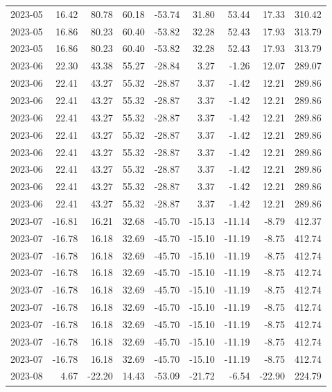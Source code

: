 \begin{table}[ht]
\begin{tabular}{lrrrrrrrr}
  2023-05 & 16.42 & 80.78 & 60.18 & -53.74 & 31.80 & 53.44 & 17.33 & 310.42 \\ 
  2023-05 & 16.86 & 80.23 & 60.40 & -53.82 & 32.28 & 52.43 & 17.93 & 313.79 \\ 
  2023-05 & 16.86 & 80.23 & 60.40 & -53.82 & 32.28 & 52.43 & 17.93 & 313.79 \\ 
  2023-06 & 22.30 & 43.38 & 55.27 & -28.84 & 3.27 & -1.26 & 12.07 & 289.07 \\ 
  2023-06 & 22.41 & 43.27 & 55.32 & -28.87 & 3.37 & -1.42 & 12.21 & 289.86 \\ 
  2023-06 & 22.41 & 43.27 & 55.32 & -28.87 & 3.37 & -1.42 & 12.21 & 289.86 \\ 
  2023-06 & 22.41 & 43.27 & 55.32 & -28.87 & 3.37 & -1.42 & 12.21 & 289.86 \\ 
  2023-06 & 22.41 & 43.27 & 55.32 & -28.87 & 3.37 & -1.42 & 12.21 & 289.86 \\ 
  2023-06 & 22.41 & 43.27 & 55.32 & -28.87 & 3.37 & -1.42 & 12.21 & 289.86 \\ 
  2023-06 & 22.41 & 43.27 & 55.32 & -28.87 & 3.37 & -1.42 & 12.21 & 289.86 \\ 
  2023-06 & 22.41 & 43.27 & 55.32 & -28.87 & 3.37 & -1.42 & 12.21 & 289.86 \\ 
  2023-06 & 22.41 & 43.27 & 55.32 & -28.87 & 3.37 & -1.42 & 12.21 & 289.86 \\ 
  2023-07 & -16.81 & 16.21 & 32.68 & -45.70 & -15.13 & -11.14 & -8.79 & 412.37 \\ 
  2023-07 & -16.78 & 16.18 & 32.69 & -45.70 & -15.10 & -11.19 & -8.75 & 412.74 \\ 
  2023-07 & -16.78 & 16.18 & 32.69 & -45.70 & -15.10 & -11.19 & -8.75 & 412.74 \\ 
  2023-07 & -16.78 & 16.18 & 32.69 & -45.70 & -15.10 & -11.19 & -8.75 & 412.74 \\ 
  2023-07 & -16.78 & 16.18 & 32.69 & -45.70 & -15.10 & -11.19 & -8.75 & 412.74 \\ 
  2023-07 & -16.78 & 16.18 & 32.69 & -45.70 & -15.10 & -11.19 & -8.75 & 412.74 \\ 
  2023-07 & -16.78 & 16.18 & 32.69 & -45.70 & -15.10 & -11.19 & -8.75 & 412.74 \\ 
  2023-07 & -16.78 & 16.18 & 32.69 & -45.70 & -15.10 & -11.19 & -8.75 & 412.74 \\ 
  2023-07 & -16.78 & 16.18 & 32.69 & -45.70 & -15.10 & -11.19 & -8.75 & 412.74 \\ 
  2023-08 & 4.67 & -22.20 & 14.43 & -53.09 & -21.72 & -6.54 & -22.90 & 224.79 \\ 

\end{tabular}
\end{table}
